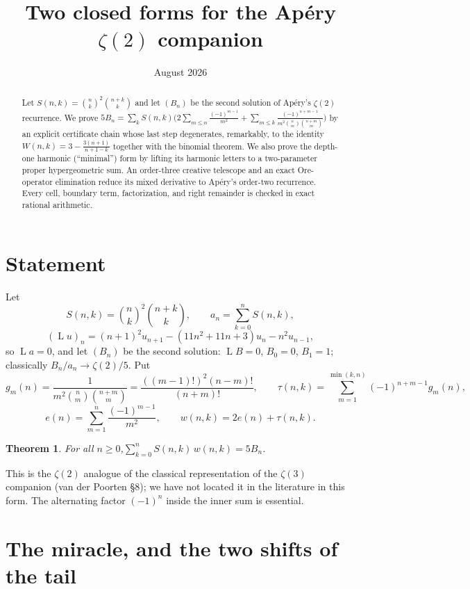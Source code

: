 \documentclass[11pt]{article}
\title{Two closed forms for the Ap\'ery $\zeta(2)$ companion}
\author{}
\date{August 2026}
\newtheorem{theorem}{Theorem}
\theoremstyle{remark}
\DeclareMathOperator{\Lop}{L}
\begin{document}
\maketitle

\begin{abstract}
Let $S(n,k)=\binom nk^2\binom{n+k}k$ and let $(B_n)$ be the second solution of
Ap\'ery's $\zeta(2)$ recurrence. We prove
$5B_n=\sum_k S(n,k)\bigl(2\sum_{m\le n}\frac{(-1)^{m-1}}{m^2}
+\sum_{m\le k}\frac{(-1)^{n+m-1}}{m^2\binom nm\binom{n+m}m}\bigr)$
by an explicit certificate chain whose last step degenerates, remarkably, to the
identity $W(n,k)=3-\frac{3(n+1)}{n+1-k}$ together with the binomial theorem.
We also prove the depth-one harmonic (``minimal'') form by lifting its harmonic
letters to a two-parameter proper hypergeometric sum.  An order-three creative
telescope and an exact Ore-operator elimination reduce its mixed derivative to
Ap\'ery's order-two recurrence.  Every cell, boundary term, factorization, and
right remainder is checked in exact rational arithmetic.
\end{abstract}

\section{Statement}

Let
\[
S(n,k)=\binom nk^{2}\binom{n+k}k,\qquad a_n=\sum_{k=0}^{n}S(n,k),
\]
\[
(\Lop u)_n=(n+1)^{2}u_{n+1}-(11n^{2}+11n+3)u_n-n^{2}u_{n-1},
\]
so $\Lop a=0$, and let $(B_n)$ be the second solution: $\Lop B=0$, $B_0=0$,
$B_1=1$; classically $B_n/a_n\to\zeta(2)/5$. Put
\[
g_m(n)=\frac1{m^{2}\binom nm\binom{n+m}m}=\frac{((m-1)!)^{2}(n-m)!}{(n+m)!},
\qquad
\tau(n,k)=\sum_{m=1}^{\min(k,n)}(-1)^{n+m-1}g_m(n),
\]
\[
e(n)=\sum_{m=1}^{n}\frac{(-1)^{m-1}}{m^{2}},\qquad
w(n,k)=2e(n)+\tau(n,k).
\]

\begin{theorem}\label{thm:cl}
For all $n\ge0$,\quad $\displaystyle\sum_{k=0}^{n}S(n,k)\,w(n,k)=5B_n$.
\end{theorem}

This is the $\zeta(2)$ analogue of the classical representation of the
$\zeta(3)$ companion (van der Poorten \S8); we have not located it in the
literature in this form. The alternating factor $(-1)^{n}$ inside the inner sum
is essential.

\section{The miracle, and the two shifts of the tail}
\end{document}
